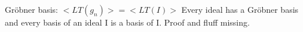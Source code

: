 Gröbner basis: 
$<LT(g_n)> = <LT(I)>$
Every ideal has a Gröbner basis and every basis of an ideal I is a basis of I. Proof and fluff missing.